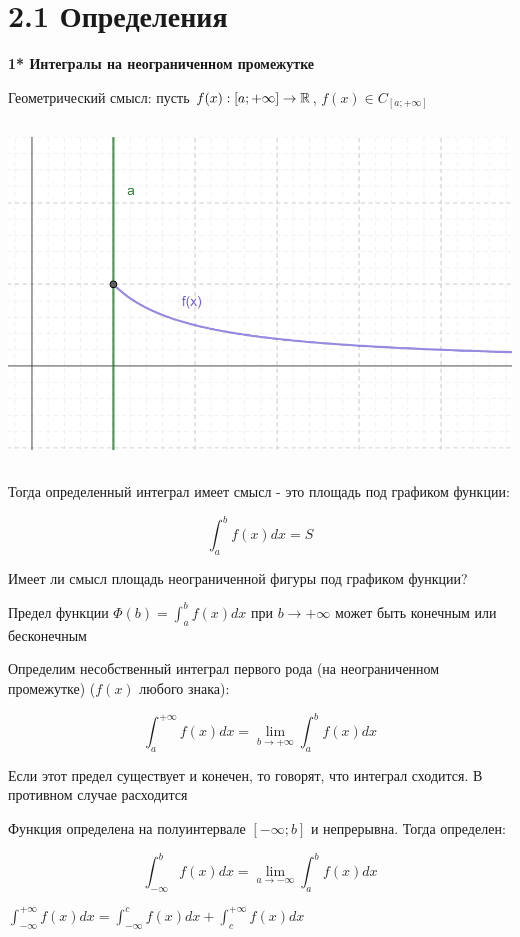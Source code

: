 \documentclass[12pt]{article}
\begin{document}
    \section{2.1 Определения}

    \textbf{1* Интегралы на неограниченном промежутке}

    Геометрический смысл: пусть $f(x) : [a; +\infty] \to \mathbb{R}$, $f(x) \in C_{[a; +\infty]}$

    \includegraphics[height=90mm]{images/calculus_2024_02_21_1}

    Тогда определенный интеграл имеет смысл - это площадь под графиком функции:

    \[\int^{b}_{a} f(x) dx = S\]

    Имеет ли смысл площадь неограниченной фигуры под графиком функции?

    Предел функции $\Phi (b) = \int^{b}_{a} f(x) dx$ при $b \to +\infty$ может быть конечным или бесконечным

     Определим несобственный интеграл первого рода (на неограниченном промежутке) ($f(x)$ любого знака):

    \[\int^{+\infty}_{a} f(x) dx = \lim_{b \to +\infty} \int^{b}_{a} f(x) dx\]

    \Nota Если этот предел существует и конечен, то говорят, что интеграл сходится. В противном случае расходится

     Функция определена на полуинтервале $[-\infty; b]$ и непрерывна. Тогда определен:

    \[\int^{b}_{-\infty} f(x) dx = \lim_{a \to -\infty} \int^{b}_{a} f(x) dx\]

     $\displaystyle \int^{+\infty}_{-\infty} f(x) dx = \int^{c}_{-\infty} f(x) dx + \int^{+\infty}_{c} f(x) dx$
\end{document}
